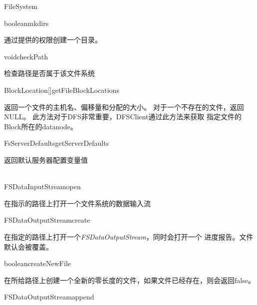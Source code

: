 \begin{XeClass}{FileSystem}
    \begin{XeMethod}{\XePublic}{boolean}{mkdirs}
         
 通过提供的权限创建一个目录。

    \end{XeMethod}

    \begin{XeMethod}{\XeProtected}{void}{checkPath}
         
 检查路径是否属于该文件系统

    \end{XeMethod}

    \begin{XeMethod}{\XePublic}{BlockLocation[]}{getFileBlockLocations}
         
 返回一个文件的主机名、偏移量和分配的大小。
 对于一个不存在的文件，返回NULL。
 此方法对于DFS非常重要，DFSClient通过此方法来获取
 指定文件的Block所在的datanode。

    \end{XeMethod}

    \begin{XeMethod}{\XePublic}{FsServerDefaults}{getServerDefaults}
         
 返回默认服务器配置变量值

    \end{XeMethod}

    \begin{XeMethod}{\XePublic \\ \XeAbstract}{FSDataInputStream}{open}
         
 在指示的路径上打开一个文件系统的数据输入流

    \end{XeMethod}

    \begin{XeMethod}{\XePublic}{FSDataOutputStream}{create}
         
 在指定的路径上打开一个\emph{FSDataOutputStream}，同时会打开一个
 进度报告。文件默认会被覆盖。

    \end{XeMethod}

    \begin{XeMethod}{\XePublic}{boolean}{createNewFile}
         
 在所给路径上创建一个全新的零长度的文件，如果文件已经存在，则会返回false。

    \end{XeMethod}

    \begin{XeMethod}{\XePublic}{FSDataOutputStream}{append}
         

\end{XeMethod}
\end{XeClass}
